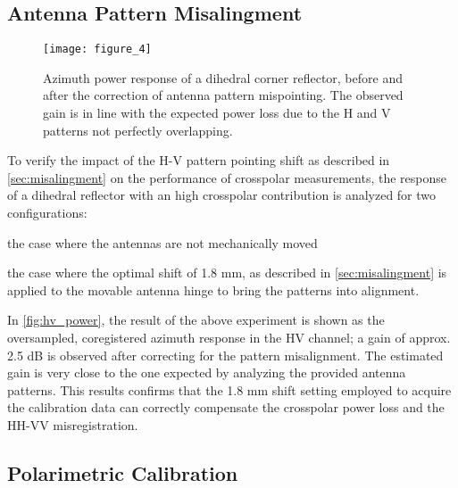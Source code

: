 \subsection{Antenna Pattern Misalingment}
\begin{figure}[ht!]
	\centering
	\texttt{[image: figure\_4]}
	\caption{Azimuth power response of a dihedral corner reflector, before and after the correction of antenna pattern mispointing. The observed gain is in line with the expected power loss due to the H and V patterns not perfectly overlapping.}
	\label{fig:hv_power}
\end{figure}
To verify the impact of the H-V pattern pointing shift as described in \autoref{sec:misalingment} on the performance of crosspolar measurements, the response of a dihedral reflector with an high crosspolar contribution is analyzed for two configurations:\\ \begin{enumerate*}\item the case where the antennas are not mechanically moved \item the case where the optimal shift of 1.8 mm, as described in \autoref{sec:misalingment} is applied to the movable antenna hinge to bring the patterns into alignment.\\ 
\end{enumerate*}
In \autoref{fig:hv_power}, the result of the above experiment is shown as the oversampled, coregistered azimuth response in the HV channel; a gain of approx. 2.5 dB is observed after correcting for the pattern misalignment. The estimated gain is very close to the one expected by analyzing the provided antenna patterns. This results confirms that the 1.8 mm shift setting employed to acquire the calibration data can correctly compensate the crosspolar power loss and the HH-VV misregistration.

\subsection{Polarimetric Calibration}\label{sec:res_polcal}

